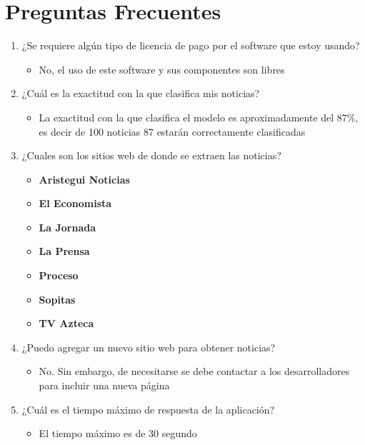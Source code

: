 \section{Preguntas Frecuentes}


\begin{enumerate}
	\item ¿Se requiere algún tipo de licencia de pago por el software que estoy usando?
	\begin{itemize}
		\item No, el uso de este software y sus componentes son libres
	\end{itemize}

	\item ¿Cuál es la exactitud con la que clasifica mis noticias?
	\begin{itemize}
		\item La exactitud con la que clasifica el modelo es aproximadamente del 87\%, es decir de 100 noticias 87 estarán correctamente clasificadas
	\end{itemize}	

	\item ¿Cuales son los sitios web de donde se extraen las noticias?
	\begin{itemize}
  		\item \textbf{Aristegui Noticias}
  		\item \textbf{El Economista}
  		\item \textbf{La Jornada}
  		\item \textbf{La Prensa}
  		\item \textbf{Proceso}
  		\item \textbf{Sopitas}
  		\item \textbf{TV Azteca}
	\end{itemize}	

	\item ¿Puedo agregar un nuevo sitio web para obtener noticias?
	\begin{itemize}	
		\item No. Sin embargo, de necesitarse se debe contactar a los desarrolladores para incluir una nueva página
	\end{itemize}

	\item ¿Cuál es el tiempo máximo de respuesta de la aplicación?
	\begin{itemize}	
		\item El tiempo máximo es de 30 segundo
	\end{itemize}


\end{enumerate}
